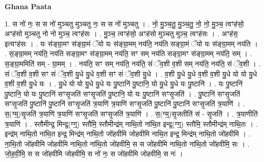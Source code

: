 \documentclass[17pt]{extarticle}
\begin{document}
\textbf{Ghana Paata } \newline

1. स नो॑ नः॒ स स नो॑ मुञ्चतु मुञ्चतु नः॒ स स नो॑ मुञ्चतु । . नो॒ मु॒ञ्च॒तु॒ मु॒ञ्च॒तु॒ नो॒ नो॒ मु॒ञ्च॒ त्वꣳह॑सो॒ अꣳह॑सो मुञ्चतु नो नो मुञ्च॒ त्वꣳह॑सः । . मु॒ञ्च॒ त्वꣳह॑सो॒ अꣳह॑सो मुञ्चतु मुञ्च॒ त्वꣳह॑सः । . अꣳह॑स॒ इत्यꣳह॑सः । . यः स॑ङ्ग्रा॒मꣳ स॑ङ्ग्रा॒मं ॅयो यः स॑ङ्ग्रा॒मम् नय॑ति॒ नय॑ति सङ्ग्रा॒मं ॅयो यः स॑ङ्ग्रा॒मम् नय॑ति । . स॒ङ्ग्रा॒मम् नय॑ति॒ नय॑ति सङ्ग्रा॒मꣳ स॑ङ्ग्रा॒मम् नय॑ति॒ सꣳ सम् नय॑ति सङ्ग्रा॒मꣳ स॑ङ्ग्रा॒मम् नय॑ति॒ सम् । . स॒ङ्ग्रा॒ममिति॑ सम् - ग्रा॒मम् । . नय॑ति॒ सꣳ सम् नय॑ति॒ नय॑ति॒ सं ॅव॒शी व॒शी सम् नय॑ति॒ नय॑ति॒ सं ॅव॒शी । . सं ॅव॒शी व॒शी सꣳ सं ॅव॒शी यु॒धे यु॒धे व॒शी सꣳ सं ॅव॒शी यु॒धे । . व॒शी यु॒धे यु॒धे व॒शी व॒शी यु॒धे यो यो यु॒धे व॒शी व॒शी यु॒धे यः । . यु॒धे यो यो यु॒धे यु॒धे यः पु॒ष्टानि॑ पु॒ष्टानि॒ यो यु॒धे यु॒धे यः पु॒ष्टानि॑ । . यः पु॒ष्टानि॑ पु॒ष्टानि॒ यो यः पु॒ष्टानि॑ सꣳसृ॒जति॑ सꣳसृ॒जति॑ पु॒ष्टानि॒ यो यः पु॒ष्टानि॑ सꣳसृ॒जति॑ । . पु॒ष्टानि॑ सꣳसृ॒जति॑ सꣳसृ॒जति॑ पु॒ष्टानि॑ पु॒ष्टानि॑ सꣳसृ॒जति॑ त्र॒याणि॑ त्र॒याणि॑ सꣳसृ॒जति॑ पु॒ष्टानि॑ पु॒ष्टानि॑ सꣳसृ॒जति॑ त्र॒याणि॑ । . स॒(ग्म्॒)सृ॒जति॑ त्र॒याणि॑ त्र॒याणि॑ सꣳसृ॒जति॑ सꣳसृ॒जति॑ त्र॒याणि॑ । . स॒(ग्म्॒)सृ॒जतीति॑ सं - सृ॒जति॑ । . त्र॒याणीति॑ त्र॒याणि॑ । . स्तौमीन्द्र॒ मिन्द्र॒(ग्ग्॒) स्तौमि॒ स्तौमीन्द्र॑म् नाथि॒तो ना॑थि॒त इन्द्र॒(ग्ग्॒) स्तौमि॒ स्तौमीन्द्र॑म् नाथि॒तः । . इन्द्र॑म् नाथि॒तो ना॑थि॒त इन्द्र॒ मिन्द्र॑म् नाथि॒तो जो॑हवीमि जोहवीमि नाथि॒त इन्द्र॒ मिन्द्र॑म् नाथि॒तो जो॑हवीमि । . ना॒थि॒तो जो॑हवीमि जोहवीमि नाथि॒तो ना॑थि॒तो जो॑हवीमि॒ स स जो॑हवीमि नाथि॒तो ना॑थि॒तो जो॑हवीमि॒ सः । . जो॒ह॒वी॒मि॒ स स जो॑हवीमि जोहवीमि॒ स नो॑ नः॒ स जो॑हवीमि जोहवीमि॒ स नः॑ । \newline
\end{document}
